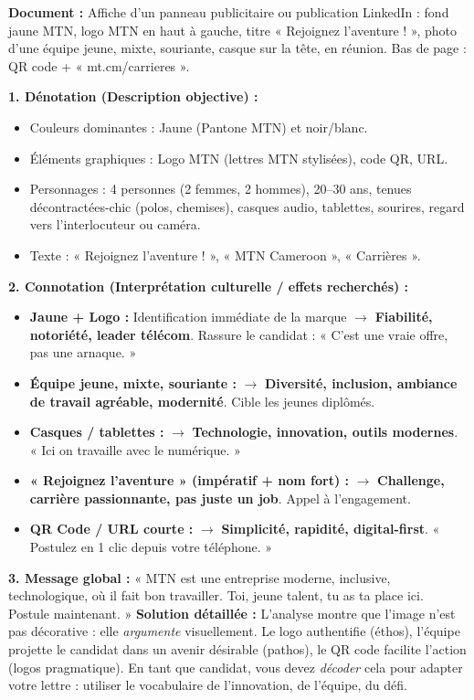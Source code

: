 \documentclass[11pt]{article}
\begin{document}
\begin{exoresolu}
\textbf{Document :} Affiche d'un panneau publicitaire ou publication LinkedIn : fond jaune MTN, logo MTN en haut à gauche, titre « Rejoignez l'aventure ! », photo d'une équipe jeune, mixte, souriante, casque sur la tête, en réunion. Bas de page : QR code + « mt.cm/carrieres ».

\textbf{1. Dénotation (Description objective) :}
\begin{itemize}
    \item Couleurs dominantes : Jaune (Pantone MTN) et noir/blanc.
    \item Éléments graphiques : Logo MTN (lettres MTN stylisées), code QR, URL.
    \item Personnages : 4 personnes (2 femmes, 2 hommes), 20--30 ans, tenues décontractées-chic (polos, chemises), casques audio, tablettes, sourires, regard vers l'interlocuteur ou caméra.
    \item Texte : « Rejoignez l'aventure ! », « MTN Cameroon », « Carrières ».
\end{itemize}

\textbf{2. Connotation (Interprétation culturelle / effets recherchés) :}
\begin{itemize}
    \item \textbf{Jaune + Logo :} Identification immédiate de la marque $\rightarrow$ \textbf{Fiabilité, notoriété, leader télécom}. Rassure le candidat : « C'est une vraie offre, pas une arnaque. »
    \item \textbf{Équipe jeune, mixte, souriante :} $\rightarrow$ \textbf{Diversité, inclusion, ambiance de travail agréable, modernité}. Cible les jeunes diplômés.
    \item \textbf{Casques / tablettes :} $\rightarrow$ \textbf{Technologie, innovation, outils modernes}. « Ici on travaille avec le numérique. »
    \item \textbf{« Rejoignez l'aventure » (impératif + nom fort) :} $\rightarrow$ \textbf{Challenge, carrière passionnante, pas juste un job}. Appel à l'engagement.
    \item \textbf{QR Code / URL courte :} $\rightarrow$ \textbf{Simplicité, rapidité, digital-first}. « Postulez en 1 clic depuis votre téléphone. »
\end{itemize}

\textbf{3. Message global :} « MTN est une entreprise moderne, inclusive, technologique, où il fait bon travailler. Toi, jeune talent, tu as ta place ici. Postule maintenant. »
\tcblower
\textbf{Solution détaillée :} L'analyse montre que l'image n'est pas décorative : elle \emph{argumente} visuellement. Le logo authentifie (éthos), l'équipe projette le candidat dans un avenir désirable (pathos), le QR code facilite l'action (logos pragmatique). En tant que candidat, vous devez \emph{décoder} cela pour adapter votre lettre : utiliser le vocabulaire de l'innovation, de l'équipe, du défi.
\end{exoresolu}
\end{document}
